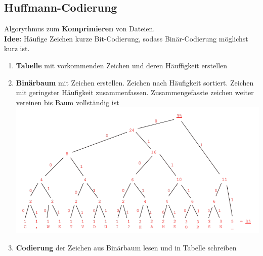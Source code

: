 \documentclass[12pt,a4paper]{article}
\begin{document}
		\subsection{Huffmann-Codierung}
			Algorythmus zum \textbf{Komprimieren} von Dateien.\\
			\textbf{Idee:} Häufige Zeichen kurze Bit-Codierung, sodass Binär-Codierung möglichst kurz ist.
			\begin{enumerate}
				\item \textbf{Tabelle} mit vorkommenden Zeichen und deren Häuffigkeit erstellen
				\item \textbf{Binärbaum} mit Zeichen erstellen. Zeichen nach Häufigkeit sortiert. Zeichen mit geringster Häufigkeit zusammenfassen. Zusammengefasste zeichen weiter vereinen bis Baum vollständig ist\\
				\includegraphics[scale=0.4]{Bilder/Huffmann-Baum.png}
				\item \textbf{Codierung} der Zeichen aus Binärbaum lesen und in Tabelle schreiben
			\end{enumerate}
\end{document}
